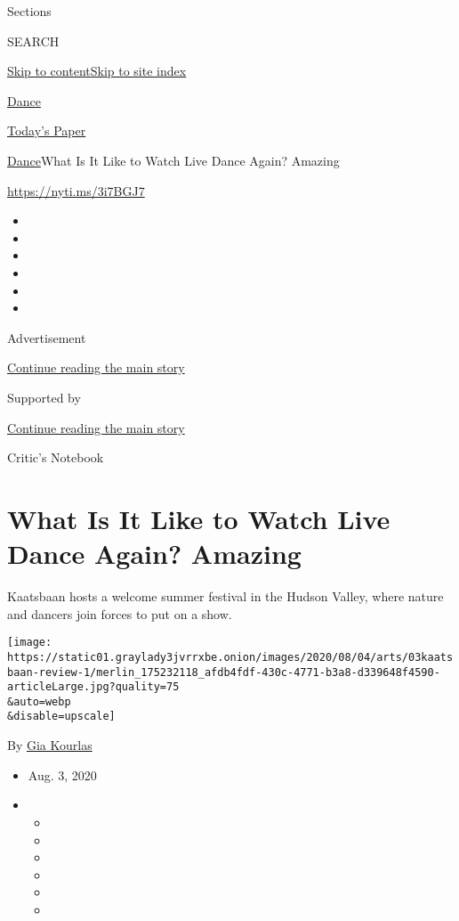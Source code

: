 Sections

SEARCH

\protect\hyperlink{site-content}{Skip to
content}\protect\hyperlink{site-index}{Skip to site index}

\href{https://www.nytimes3xbfgragh.onion/section/arts/dance}{Dance}

\href{https://myaccount.nytimes3xbfgragh.onion/auth/login?response_type=cookie\&client_id=vi}{}

\href{https://www.nytimes3xbfgragh.onion/section/todayspaper}{Today's
Paper}

\href{/section/arts/dance}{Dance}\textbar{}What Is It Like to Watch Live
Dance Again? Amazing

\url{https://nyti.ms/3i7BGJ7}

\begin{itemize}
\item
\item
\item
\item
\item
\item
\end{itemize}

Advertisement

\protect\hyperlink{after-top}{Continue reading the main story}

Supported by

\protect\hyperlink{after-sponsor}{Continue reading the main story}

Critic's Notebook

\hypertarget{what-is-it-like-to-watch-live-dance-again-amazing}{%
\section{What Is It Like to Watch Live Dance Again?
Amazing}\label{what-is-it-like-to-watch-live-dance-again-amazing}}

Kaatsbaan hosts a welcome summer festival in the Hudson Valley, where
nature and dancers join forces to put on a show.

\texttt{[image: https://static01.graylady3jvrrxbe.onion/images/2020/08/04/arts/03kaatsbaan-review-1/merlin\_175232118\_afdb4fdf-430c-4771-b3a8-d339648f4590-articleLarge.jpg?quality=75\\\&auto=webp\\\&disable=upscale]}

By \href{https://www.nytimes3xbfgragh.onion/by/gia-kourlas}{Gia Kourlas}

\begin{itemize}
\item
  Aug. 3, 2020
\item
  \begin{itemize}
  \item
  \item
  \item
  \item
  \item
  \item
  \end{itemize}
\end{itemize}

